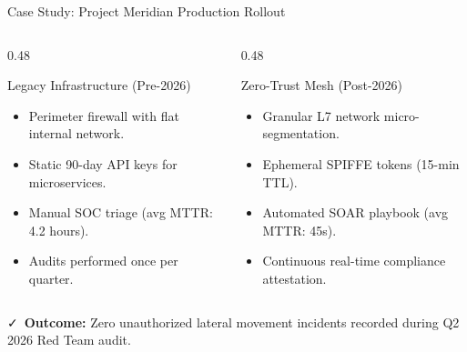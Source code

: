 \documentclass[aspectratio=169, 10pt]{beamer}
\begin{document}
\begin{frame}{Case Study: Project Meridian Production Rollout}
  \begin{columns}[T]
    \begin{column}{0.48\textwidth}
      \begin{alertcard}{Legacy Infrastructure (Pre-2026)}
        \begin{itemize}
          \item Perimeter firewall with flat internal network.
          \item Static 90-day API keys for microservices.
          \item Manual SOC triage (avg MTTR: 4.2 hours).
          \item Audits performed once per quarter.
        \end{itemize}
      \end{alertcard}
    \end{column}

    \begin{column}{0.48\textwidth}
      \begin{cybercard}{Zero-Trust Mesh (Post-2026)}
        \begin{itemize}
          \item Granular L7 network micro-segmentation.
          \item Ephemeral SPIFFE tokens (15-min TTL).
          \item Automated SOAR playbook (avg MTTR: 45s).
          \item Continuous real-time compliance attestation.
        \end{itemize}
      \end{cybercard}
    \end{column}
  \end{columns}

  \vspace{4pt}
  \begin{tcolorbox}[colback=bgcard, colframe=cybergreen, arc=3pt, left=7pt, right=7pt, top=3pt, bottom=3pt]
    {\small\color{cybergreen}\faCheck\ \textbf{Outcome:}} {\small Zero unauthorized lateral movement incidents recorded during Q2 2026 Red Team audit.}
  \end{tcolorbox}
\end{frame}
\end{document}
